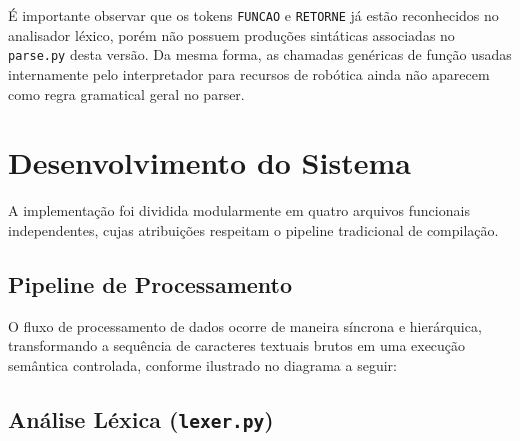 \documentclass[12pt,a4paper]{article}
\begin{document}
É importante observar que os tokens \texttt{FUNCAO} e \texttt{RETORNE} já estão reconhecidos no analisador léxico, porém não possuem produções sintáticas associadas no \texttt{parse.py} desta versão. Da mesma forma, as chamadas genéricas de função usadas internamente pelo interpretador para recursos de robótica ainda não aparecem como regra gramatical geral no parser.

\section{Desenvolvimento do Sistema}

A implementação foi dividida modularmente em quatro arquivos funcionais independentes, cujas atribuições respeitam o pipeline tradicional de compilação.

\subsection{Pipeline de Processamento}

O fluxo de processamento de dados ocorre de maneira síncrona e hierárquica, transformando a sequência de caracteres textuais brutos em uma execução semântica controlada, conforme ilustrado no diagrama a seguir:

\begin{center}
\end{center}


\subsection{Análise Léxica (\texttt{lexer.py})}
\end{document}

